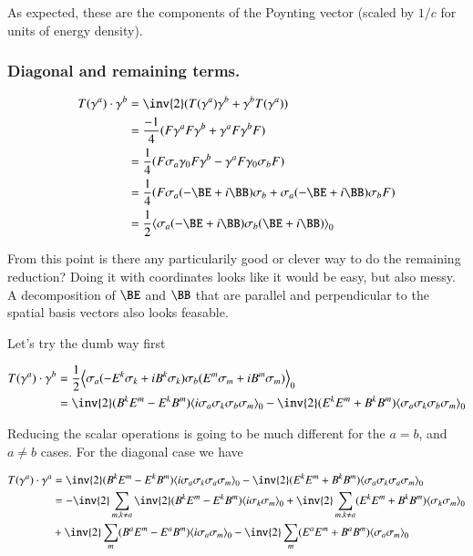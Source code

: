 \documentclass{article}
\begin{document}
As expected, these are the components of the Poynting vector (scaled by $1/c$ for units of energy density).

\subsubsection{ Diagonal and remaining terms. }

\begin{align*}
T(\gamma^a) \cdot \gamma^b 
&= \inv{2} (T(\gamma^a) \gamma^b + \gamma^b T(\gamma^a)) \\
&= \frac{-1}{4} (F \gamma^a F \gamma^b + \gamma^a F \gamma^b F) \\
&= \frac{1}{4} (F \sigma_a \gamma_0 F \gamma^b - \gamma^a F \gamma_0 \sigma_b F) \\
&= \frac{1}{4} (F \sigma_a (-\BE + i \BB) \sigma_b + \sigma_a (-\BE + i \BB) \sigma_b F) \\
&= \frac{1}{2} \gpgradezero{\sigma_a (-\BE + i \BB) \sigma_b (\BE + i\BB) } \\
\end{align*}

From this point is there any particularily good or clever way to do the remaining reduction?  Doing it with 
coordinates looks like it would be easy, but also messy.  A decomposition of $\BE$ and $\BB$ that are parallel
and perpendicular to the spatial basis vectors also looks feasable.

Let's try the dumb way first

\begin{align*}
T(\gamma^a) \cdot \gamma^b 
&= \frac{1}{2} \gpgradezero{\sigma_a (-E^k \sigma_k + i B^k \sigma_k) \sigma_b (E^m \sigma_m + i B^m \sigma_m) } \\
&= 
\inv{2} (B^k E^m - E^k B^m) \gpgradezero{ i \sigma_a \sigma_k \sigma_b \sigma_m } 
- \inv{2} (E^k E^m + B^k B^m) \gpgradezero{ \sigma_a \sigma_k \sigma_b \sigma_m } \\
\end{align*}

Reducing the scalar operations is going to be much different for the $a = b$, and $a \ne b$ cases.  For the diagonal case
we have 

\begin{align*}
T(\gamma^a) \cdot \gamma^a 
&= 
\inv{2} (B^k E^m - E^k B^m) \gpgradezero{ i \sigma_a \sigma_k \sigma_a \sigma_m } 
- \inv{2} (E^k E^m + B^k B^m) \gpgradezero{ \sigma_a \sigma_k \sigma_a \sigma_m } \\
&= 
- \inv{2} \sum_{m, k \ne a} \inv{2} (B^k E^m - E^k B^m) \gpgradezero{ i \sigma_k \sigma_m } 
+ \inv{2} \sum_{m, k \ne a} (E^k E^m + B^k B^m) \gpgradezero{ \sigma_k \sigma_m } \\
&+ \inv{2} \sum_{m} (B^a E^m - E^a B^m) \gpgradezero{ i \sigma_a \sigma_m } 
- \inv{2} \sum_m (E^a E^m + B^a B^m) \gpgradezero{ \sigma_a \sigma_m } \\
\end{align*}
\end{document}
